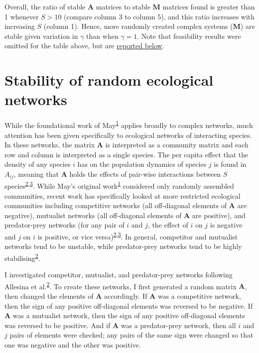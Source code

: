 \documentclass[]{article}
\begin{document}
Overall, the ratio of stable \(\mathbf{A}\) matrices to stable
\(\mathbf{M}\) matrices found is greater than 1 whenever \(S > 10\)
(compare column 3 to column 5), and this ratio increases with increasing
\(S\) (column 1). Hence, more randomly created complex systems
(\(\mathbf{M}\)) are stable given variation in \(\gamma\) than when
\(\gamma = 1\). Note that feasibility results were omitted for the table
above, but are \protect\hyperlink{Feasibility}{reported below}.

\hypertarget{ecological}{\section{Stability of random ecological
networks}\label{ecological}}

While the foundational work of
May\textsuperscript{\protect\hyperlink{ref-May1972}{1}} applies broadly
to complex networks, much attention has been given specifically to
ecological networks of interacting species. In these networks, the
matrix \(\mathbf{A}\) is interpreted as a community matrix and each row
and column is interpreted as a single species. The per capita effect
that the density of any species \(i\) has on the population dynamics of
species \(j\) is found in \(A_{ij}\), meaning that \(\mathbf{A}\) holds
the effects of pair-wise interactions between \(S\)
species\textsuperscript{\protect\hyperlink{ref-Allesina2012}{2},\protect\hyperlink{ref-Allesina2015}{3}}.
While May's original
work\textsuperscript{\protect\hyperlink{ref-May1972}{1}} considered only
randomly assembled communities, recent work has specifically looked at
more restricted ecological communities including competitive networks
(all off-diagonal elements of \(\mathbf{A}\) are negative), mutualist
networks (all off-diagonal elements of \(\mathbf{A}\) are positive), and
predator-prey networks (for any pair of \(i\) and \(j\), the effect of
\(i\) on \(j\) is negative and \(j\) on \(i\) is positive, or vice
versa)\textsuperscript{\protect\hyperlink{ref-Allesina2012}{2},\protect\hyperlink{ref-Allesina2015}{3}}.
In general, competitor and mutualist networks tend to be unstable, while
predator-prey networks tend to be highly
stabilising\textsuperscript{\protect\hyperlink{ref-Allesina2012}{2}}.

I investigated competitor, mutualist, and predator-prey networks
following Allesina et
al.\textsuperscript{\protect\hyperlink{ref-Allesina2012}{2}}. To create
these networks, I first generated a random matrix \(\mathbf{A}\), then
changed the elements of \(\mathbf{A}\) accordingly. If \(\mathbf{A}\)
was a competitive network, then the sign of any positive off-diagonal
elements was reversed to be negative. If \(\mathbf{A}\) was a mutualist
network, then the sign of any positive off-diagonal elements was
reversed to be positive. And if \(\mathbf{A}\) was a predator-prey
network, then all \(i\) and \(j\) pairs of elements were checked; any
pairs of the same sign were changed so that one was negative and the
other was positive.
\end{document}
